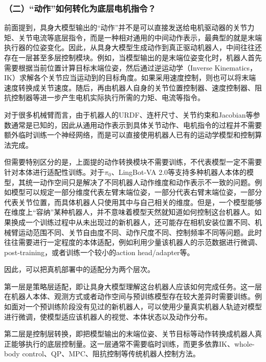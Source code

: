 \hypertarget{ux4e8cux52a8ux4f5cux5982ux4f55ux8f6cux5316ux4e3aux5e95ux5c42ux7535ux673aux6307ux4ee4}{%
\subsubsection{（二）``动作''如何转化为底层电机指令？}\label{ux4e8cux52a8ux4f5cux5982ux4f55ux8f6cux5316ux4e3aux5e95ux5c42ux7535ux673aux6307ux4ee4}}

前面提到，具身大模型输出的``动作''并不是可以直接发送给电机驱动器的关节力矩、关节电流等底层指令，而是一种相对通用的中间动作表示，最典型的就是末端执行器的位姿变化。因此，从具身大模型生成动作到真正驱动机器人，中间往往还存在一层甚至多层控制模块。例如，当模型输出的是末端位姿变化时，机器人首先需要根据当前位置计算目标末端位姿，然后通过逆运动学（Inverse Kinematics，IK）求解各个关节应当运动到的目标角度。如果采用速度控制，则也可以将末端速度转换成关节速度。随后，再由机器人自身的关节位置控制器、速度控制器、阻抗控制器等进一步产生电机实际执行所需的力矩、电流等指令。

对于很多机械臂而言，由于机器人的URDF、连杆尺寸、关节约束和Jacobian等参数通常是已知的，因此从通用动作表示到具体关节动作、电机指令的过程并不需要额外临时训练一个神经网络，而是可以直接使用机器人已有的运动学模型和控制算法完成。

但需要特别区分的是，上面提的动作转换模块不需要训练，不代表模型一定不需要针对本体进行适配性训练。对于\(\pi_0\)、LingBot-VA 2.0等支持多种机器人本体的模型，其统一动作空间只是解决了不同机器人动作维度和动作表示不一致的问题。例如模型可以规定一部分维度代表左臂末端位姿，一部分代表右臂末端位姿，一部分代表关节位置，而具体机器人只使用其中与自己相关的维度。但是，一个模型能够在维度上``容纳''某种机器人，并不意味着模型天然就知道如何控制这台机器人。如果换成一个训练过程中从未出现过的新机器人，还可能存在相机安装位置不同、机械臂运动范围不同、关节自由度不同、动作尺度不同、控制频率不同等问题。此时往往需要进行一定程度的本体适配，例如利用少量该机器人的示范数据进行微调、post-training，或者训练一个较小的action head/adapter等。

因此，可以把真机部署中的适配分为两个层次。

第一层是策略层适配，即让具身大模型理解这台机器人应该如何完成任务。这一层在机器人本体、观测方式或者动作空间与预训练模型存在较大差异时需要训练。例如面对一个预训练阶段没有见过的新机器人，可以使用少量真实机器人轨迹对模型进行微调，使模型适应该机器人的视觉、本体状态以及动作分布。

第二层是控制层转换，即把模型输出的末端位姿、关节目标等动作转换成机器人真正能够执行的底层控制量。这一层通常不需要临时训练，而更多依靠IK、whole-body control、QP、MPC、阻抗控制等传统机器人控制方法。

